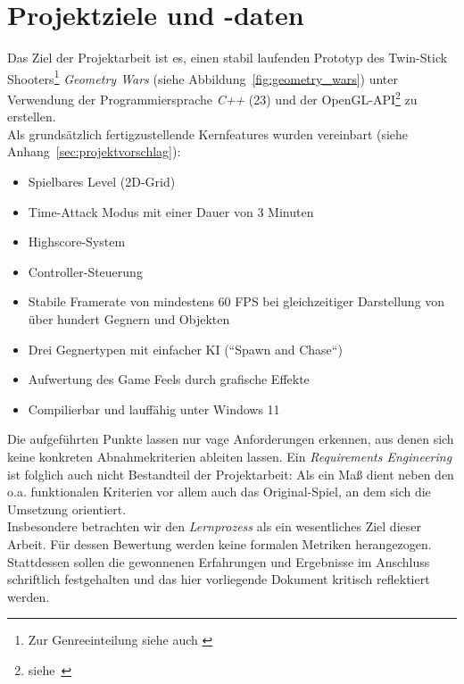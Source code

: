 \section{Projektziele und -daten}\label{sec:projektdaten}

Das Ziel der Projektarbeit ist es, einen stabil laufenden Prototyp des Twin-Stick Shooters\footnote{
Zur Genreeinteilung siehe auch \cite[]{GameDeveloper}
} \textit{Geometry Wars} (siehe Abbildung~\ref{fig:geometry_wars}) unter Verwendung der Programmiersprache \textit{C++} (23) und der OpenGL-API\footnote{siehe~\cite[]{OpenGLHomepage}
}  zu erstellen.\\

\noindent
Als grundsätzlich fertigzustellende Kernfeatures wurden vereinbart (siehe Anhang~\ref{sec:projektvorschlag}):

\vspace{2mm}
\begin{itemize}
    \itemsep0.5em
    \item Spielbares Level (2D-Grid)
    \item Time-Attack Modus mit einer Dauer von 3 Minuten
    \item Highscore-System
    \item Controller-Steuerung
    \item Stabile Framerate von mindestens 60 FPS bei gleichzeitiger Darstellung von über hundert Gegnern und Objekten
    \item Drei Gegnertypen mit einfacher KI (``Spawn and Chase``)
    \item Aufwertung des Game Feels durch grafische Effekte
    \item Compilierbar und lauffähig unter Windows 11
\end{itemize}
\vspace{2mm}

Die aufgeführten Punkte lassen nur vage Anforderungen erkennen, aus denen sich keine konkreten Abnahmekriterien ableiten lassen.
Ein \textit{Requirements Engineering} ist folglich auch nicht Bestandteil der Projektarbeit: Als ein Maß dient neben den o.a. funktionalen Kriterien vor allem auch das Original-Spiel, an dem sich die Umsetzung orientiert.\\

Insbesondere betrachten wir den \textit{Lernprozess} als ein wesentliches Ziel dieser Arbeit.
Für dessen Bewertung werden keine formalen Metriken herangezogen.
Stattdessen sollen die gewonnenen Erfahrungen und Ergebnisse im Anschluss schriftlich festgehalten und das hier vorliegende Dokument kritisch reflektiert werden.\\

